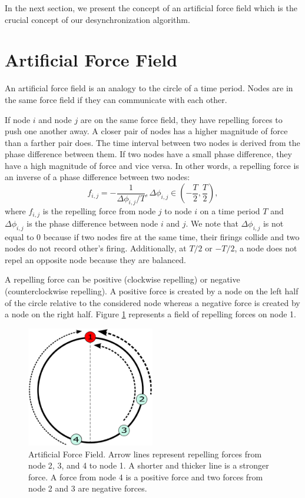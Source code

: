 In the next section, we present the concept of an artificial force field which is the crucial concept of our desynchronization algorithm.

\section{Artificial Force Field}
\label{sec:forcefield}
An artificial force field is an analogy to the circle of a time period.
Nodes are in the same force field if they can communicate with each other. 

If node $i$ and node $j$ are on the same force field, they have repelling forces to push one another away. 
A closer pair of nodes has a higher magnitude of force than a farther pair does.
The time interval between two nodes is derived from the phase difference between them.
If two nodes have a small phase difference, they have a high magnitude of force and vice versa.
In other words, a repelling force is an inverse of a phase difference between two nodes:
\begin{equation}
f_{i,j} = - \frac{1}{\Delta \phi_{i,j} / T} , \Delta \phi_{i,j} \in (-\frac{T}{2}, \frac{T}{2}),
\label{eq:force}
\end{equation}
where $f_{i,j}$ is the repelling force from node $j$ to node $i$ on a time period $T$ and $\Delta \phi_{i,j}$ is the phase difference between node $i$ and $j$.
We note that $\Delta \phi_{i,j}$ is not equal to 0 because if two nodes fire at the same time, their firings collide and two nodes do not record other's firing. Additionally, at $T/2$ or $-T/2$, a node does not repel an opposite node because they are balanced.

A repelling force can be positive (clockwise repelling) or negative (counterclockwise repelling).
A positive force is created by a node on the left half of the circle relative to the considered node whereas a negative force is created by a node on the right half.
Figure \ref{fig:force_field} represents a field of repelling forces on node 1. 

\begin{figure}[!t]
\centering
\includegraphics[width=2.2in]{figure/forcefield}
\caption{Artificial Force Field. Arrow lines represent repelling forces from node 2, 3, and 4 to node 1. A shorter and thicker line is a stronger force. A force from node 4 is a positive force and two forces from node 2 and 3 are negative forces.}
\label{fig:force_field}
\end{figure}

